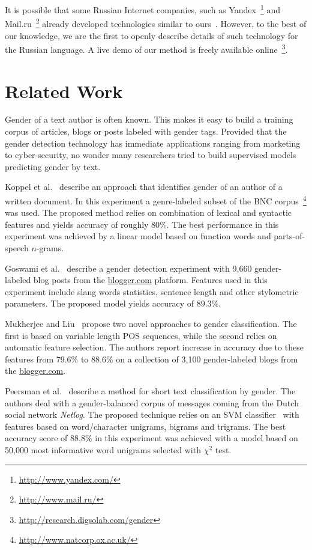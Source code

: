 \documentclass[runningheads,a4paper]{llncs}
\begin{document}
It is possible that some Russian Internet companies, such as Yandex~\footnote{\url{http://www.yandex.com/}} and Mail.ru~\footnote{\url{http://www.mail.ru/}} already developed technologies similar to ours~\cite{daniel2013research}. However, to the best of our knowledge, we are the first to openly describe details of such technology for the Russian language. A live demo of our method is freely available online~\footnote{ \url{http://research.digsolab.com/gender}}.

\section{Related Work}
\label{sec:related}

Gender of a text author is often known. This makes it easy to build a training corpus of articles, blogs or posts labeled with gender tags.  Provided that the gender detection technology has immediate applications ranging from marketing to cyber-security, no wonder many researchers tried to build supervised models predicting gender by text. 

Koppel et al.~\cite{koppel2002automatically} describe an approach that identifies gender of an author of a written document. In this experiment a genre-labeled subset of the BNC corpus~\footnote{\url{http://www.natcorp.ox.ac.uk/}} was used. The proposed method relies on  combination of lexical and syntactic features and yields accuracy of roughly 80\%. The best performance in this experiment was achieved by a linear model based on function words and parts-of-speech $n$-grams.

Goswami et al.~\cite{goswami2009stylometric} describe a gender detection experiment with 9,660 gender-labeled blog posts from the \url{blogger.com} platform. Features used in this experiment include slang words statistics, sentence length and other stylometric parameters. The proposed model yields accuracy of 89.3\%.

Mukherjee and Liu~\cite{mukherjee2010improving} propose two novel approaches to gender classification. The first is based on variable length POS sequences, while the second relies on automatic feature selection. The authors report increase in accuracy due to these features from 79.6\% to 88.6\% on a collection of 3,100 gender-labeled blogs from the \url{blogger.com}.

Peersman et al.~\cite{peersman2011predicting} describe a method for short text classification by gender. The authors deal with a gender-balanced corpus of messages coming from the Dutch social network \textit{Netlog}. The proposed technique relies on an SVM classifier~\cite{vapnik} with features based on word/character unigrams, bigrams and trigrams. The best accuracy score of 88,8\% in this experiment was achieved with a model based on 50,000 most informative word unigrams selected with $\chi^2$ test.
\end{document}
